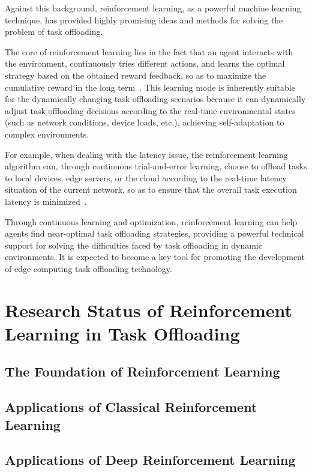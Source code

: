 \documentclass[journal]{IEEEtran}
\begin{document}
Against this background, reinforcement learning, as a powerful machine learning technique, has provided highly promising ideas and methods for solving the problem of task offloading.

The core of reinforcement learning lies in the fact that an agent interacts with the environment, 
continuously tries different actions, and learns the optimal strategy based on the obtained reward feedback, 
so as to maximize the cumulative reward in the long term~\cite{1998Reinforcement}. 
This learning mode is inherently suitable for the dynamically changing task offloading scenarios 
because it can dynamically adjust task offloading decisions according to the real-time environmental states 
(such as network conditions, device loads, etc.), achieving self-adaptation to complex environments.

For example, when dealing with the latency issue, the reinforcement learning algorithm can, through continuous trial-and-error learning, choose to offload tasks to local devices, edge servers, or the cloud according to the real-time latency situation of the current network, so as to ensure that the overall task execution latency is minimized~\cite{9310745}.

Through continuous learning and optimization, reinforcement learning can help agents find near-optimal task offloading strategies, providing a powerful technical support for solving the difficulties faced by task offloading in dynamic environments. It is expected to become a key tool for promoting the development of edge computing task offloading technology.

\section{Research Status of Reinforcement Learning in Task Offloading}

\subsection{The Foundation of Reinforcement Learning}

\subsection{Applications of Classical Reinforcement Learning}

\subsection{Applications of Deep Reinforcement Learning}
\end{document}
